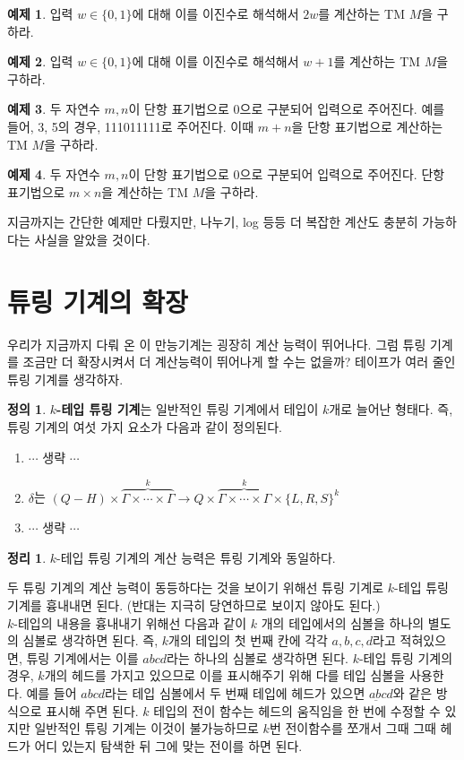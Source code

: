 \documentclass[b5paper]{book}
\theoremstyle{definition}
\newtheorem{defn}{정의}[chapter]
\newtheorem{thm}{정리}[chapter]
\newtheorem{ex}{예제}[chapter]
\newenvironment{pf*}{\pushQED{\qed}\pf}{\popQED\endpf}
\begin{document}
\begin{ex}
    입력 $w \in \{0,1\}$에 대해 이를 이진수로 해석해서 $2w$를 계산하는 
    TM $M$을 구하라. 
\end{ex}
\begin{ex}
    입력 $w \in \{0,1\}$에 대해 이를 이진수로 해석해서 $w + 1$를 계산하는 
    TM $M$을 구하라. 
\end{ex}
\begin{ex}
    두 자연수 $m, n$이 단항 표기법으로 0으로 구분되어 입력으로 주어진다.
    예를 들어, 3, 5의 경우, 111011111로 주어진다. 이때 $m+n$을
    단항 표기법으로 계산하는 TM $M$을 구하라. 
\end{ex}
\begin{ex}
    두 자연수 $m,n$이 단항 표기법으로 0으로 구분되어 입력으로 주어진다.
    단항 표기법으로 $m \times n$을 계산하는 TM $M$을 구하라. 
\end{ex}
지금까지는 간단한 예제만 다뤘지만, 나누기, log 등등 더 복잡한 계산도 
충분히 가능하다는 사실을 알았을 것이다.
\section{튜링 기계의 확장}
우리가 지금까지 다뤄 온 이 만능기계는 굉장히 계산 능력이 뛰어나다. 그럼 튜링 기계를 조금만
더 확장시켜서 더 계산능력이 뛰어나게 할 수는 없을까? 테이프가 여러 줄인 튜링 기계를 생각하자.
\begin{defn}
\textbf{$k$-테입 튜링 기계}는 일반적인 튜링 기계에서 테입이 $k$개로 늘어난 형태다. 즉, 튜링 기계의 
여섯 가지 요소가 다음과 같이 정의된다.
\begin{enumerate}
    \item $\cdots$ 생략 $\cdots$
    \item $\delta$는 $(Q-H) \times \overbrace{\Gamma \times \cdots \times \Gamma}^k \rightarrow 
    Q \times \overbrace{\Gamma \times \cdots \times \Gamma}^k \times \{L, R, S\}^k $ 
    \item $\cdots$ 생략 $\cdots$
\end{enumerate}
\end{defn}
\begin{thm}
    $k$-테입 튜링 기계의 계산 능력은 튜링 기계와 동일하다. 
\end{thm}
\begin{pf*}
    두 튜링 기계의 계산 능력이 동등하다는 것을 보이기 위해선 튜링 기계로 $k$-테입 튜링 기계를 
    흉내내면 된다. (반대는 지극히 당연하므로 보이지 않아도 된다.) \\ 
    $k$-테입의 내용을 흉내내기 위해선 다음과 같이 $k$ 개의 테입에서의 심볼을 하나의 별도의 심볼로
    생각하면 된다. 즉, $k$개의 테입의 첫 번째 칸에 각각 $a,b,c,d$라고 적혀있으면, 튜링 기계에서는 
    이를 $abcd$라는 하나의 심볼로 생각하면 된다. $k$-테입 튜링 기계의 경우, $k$개의 헤드를 가지고
    있으므로 이를 표시해주기 위해 다를 테입 심볼을 사용한다. 예를 들어 $abcd$라는 테입 심볼에서
    두 번째 테입에 헤드가 있으면 $a\underbar{b}cd$와 같은 방식으로 표시해 주면 된다. 
    $k$ 테입의 전이 함수는 헤드의 움직임을 한 번에 수정할 수 있지만  
    일반적인 튜링 기계는 이것이 불가능하므로 $k$번 전이함수를 쪼개서 그때 그때 헤드가
    어디 있는지 탐색한 뒤 그에 맞는 전이를 하면 된다. 
\end{pf*}
\end{document}
